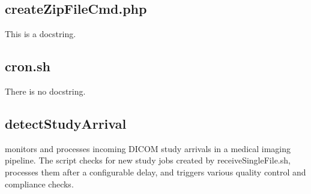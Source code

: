 \documentclass[letterpaper,10pt,english]{sphinxmanual}
\begin{document}
\sphinxstepscope


\subsection{createZipFileCmd.php}
\label{\detokenize{Architecture/scripts/createZipFileCmd:createzipfilecmd-php}}\label{\detokenize{Architecture/scripts/createZipFileCmd::doc}}
\sphinxAtStartPar
This is a docstring.

\sphinxstepscope


\subsection{cron.sh}
\label{\detokenize{Architecture/scripts/cron:cron-sh}}\label{\detokenize{Architecture/scripts/cron::doc}}
\sphinxAtStartPar
There is no docstring.

\sphinxstepscope


\subsection{detectStudyArrival}
\label{\detokenize{Architecture/scripts/detectStudyArrival:detectstudyarrival}}\label{\detokenize{Architecture/scripts/detectStudyArrival::doc}}
\sphinxAtStartPar
{} monitors and processes incoming DICOM study arrivals in a medical imaging pipeline. The script checks for new study jobs created by receiveSingleFile.sh, processes them after a configurable delay, and triggers various quality control and compliance checks.

\sphinxAtStartPar
{}
\end{document}
